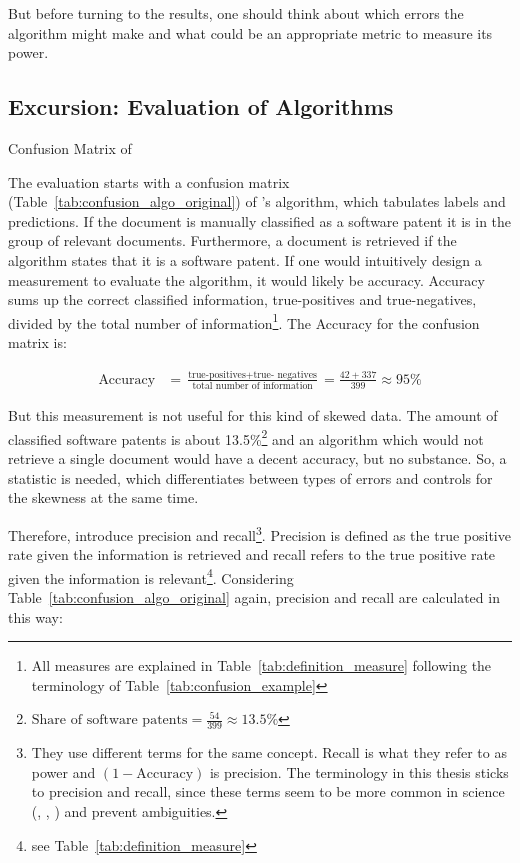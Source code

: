 \documentclass[12pt, a4paper]{scrartcl}
\newcommand{\ra}[1]{\renewcommand{\arraystretch}{#1}}
\theoremstyle{definition}
\begin{document}
But before turning to the results, one should think about which errors the
algorithm might make and what could be an appropriate metric to measure its
power.

\subsection{Excursion: Evaluation of Algorithms}

\begin{table}[tb]\caption{Confusion Matrix of \cite{bessen2007empirical}}\label{tab:confusion_algo_original}\centering\ra{1.3}
    
\end{table}

The evaluation starts with a confusion matrix
(Table~\ref{tab:confusion_algo_original}) of \citeauthor{bessen2007empirical}'s
algorithm, which tabulates labels and predictions. If the document is manually
classified as a software patent it is in the group of relevant documents.
Furthermore, a document is retrieved if the algorithm states that it is a
software patent. If one would intuitively design a measurement to evaluate the
algorithm, it would likely be accuracy. Accuracy sums up the correct classified
information, true-positives and true-negatives, divided by the total number of
information\footnote{All measures are explained in
Table~\ref{tab:definition_measure} following the terminology of
Table~\ref{tab:confusion_example}}. The Accuracy for the confusion matrix is:

\begin{align*}
\text{Accuracy} &= \frac{\text{true-positives} + \text{true-
negatives}}{\text{total number of information}} = \frac{42 + 337}{399} \approx
95\%
\end{align*}

But this measurement is not useful for this kind of skewed data. The amount of
classified software patents is about 13.5\%\footnote{$\text{Share of software
patents} = \frac{54}{399} \approx 13.5\%$} and an algorithm which would not
retrieve a single document would have a decent accuracy, but no substance. So,
a statistic is needed, which differentiates between types of errors and
controls for the skewness at the same time.

Therefore, \citeauthor{bessen2007empirical} introduce precision and
recall\footnote{They use different terms for the same concept. Recall is what
they refer to as power and $(1-\text{Accuracy})$ is precision. The terminology
in this thesis sticks to precision and recall, since these terms seem to be
more common in science (\citet[p.~155]{manning2008introduction},
\citet[p.~2]{powers2011evaluation}, \citet[p.~2]{fawcett2006introduction}) and
prevent ambiguities.}. Precision is defined as the true positive rate given the
information is retrieved and recall refers to the true positive rate given the
information is relevant\footnote{see Table~\ref{tab:definition_measure}}.
Considering Table~\ref{tab:confusion_algo_original} again, precision and recall
are calculated in this way:
\end{document}
